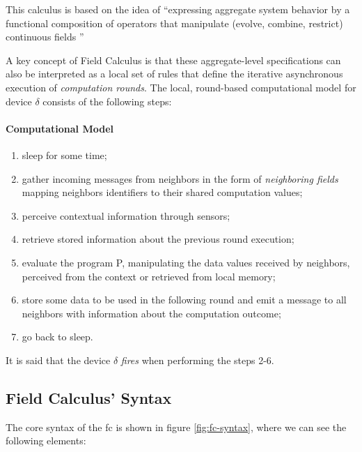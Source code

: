 This calculus is based on the idea of ``expressing aggregate system behavior by a functional composition of operators that manipulate (evolve, combine, restrict) continuous fields \cite{10.1007/978-3-642-45364-9_11}''

A key concept of Field Calculus is that these aggregate-level specifications can also be interpreted as a local set of rules that define the iterative asynchronous execution of \textit{computation rounds}.
The local, round-based computational model for device $\delta$ consists of the following steps:

\paragraph{Computational Model}
\label{par:comp-model}
\begin{enumerate}
    \item sleep for some time;
    \item gather incoming messages from neighbors in the form of \textit{neighboring fields} mapping neighbors identifiers to their shared computation values;
    \item perceive contextual information through sensors;
    \item retrieve stored information about the previous round execution;
    \item evaluate the program P, manipulating the data values received by neighbors, perceived from the context or retrieved from local memory;
    \item store some data to be used in the following round and emit a message to all neighbors with information about the computation outcome;
    \item go back to sleep.
\end{enumerate}

It is said that the device $\delta$ \textit{fires} when performing the steps 2-6.

\subsection{Field Calculus' Syntax}
\label{subsec:fc-syntax}
The core syntax of the \ac{fc} is shown in figure \ref{fig:fc-syntax}, where we can see the following elements:

